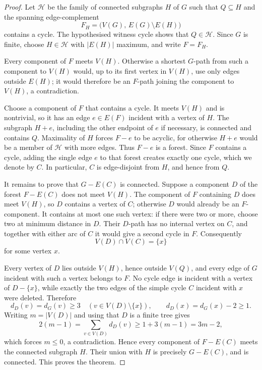 \documentclass[a4paper,11pt]{article}
\newcommand{\abs}[1]{\left\lvert#1\right\rvert}
\numberwithin{equation}{section}
\begin{document}
\begin{proof}
  Let $\mathcal H$ be the family of connected subgraphs $H$ of $G$ such that
  $Q\subseteq H$ and the spanning edge-complement
  \[
    F_H=\bigl(V(G),\,E(G)\setminus E(H)\bigr)
  \]
  contains a cycle. The hypothesised witness cycle shows that
  $Q\in\mathcal H$. Since $G$ is finite, choose $H\in\mathcal H$ with
  $\abs{E(H)}$ maximum, and write $F=F_H$.

  Every component of $F$ meets $V(H)$. Otherwise a shortest $G$-path from such
  a component to $V(H)$ would, up to its first vertex in $V(H)$, use only edges
  outside $E(H)$; it would therefore be an $F$-path joining the component to
  $V(H)$, a contradiction.

  Choose a component of $F$ that contains a cycle. It meets $V(H)$ and is
  nontrivial, so it has an edge $e\in E(F)$ incident with a vertex of $H$. The
  subgraph $H+e$, including the other endpoint of $e$ if necessary, is
  connected and contains $Q$. Maximality of $H$ forces $F-e$ to be acyclic,
  for otherwise $H+e$ would be a member of $\mathcal H$ with more edges. Thus
  $F-e$ is a forest. Since $F$ contains a cycle, adding the single edge $e$ to
  that forest creates exactly one cycle, which we denote by $C$. In
  particular, $C$ is edge-disjoint from $H$, and hence from $Q$.

  It remains to prove that $G-E(C)$ is connected. Suppose a component $D$ of
  the forest $F-E(C)$ does not meet $V(H)$. The component of $F$ containing $D$
  does meet $V(H)$, so $D$ contains a vertex of $C$; otherwise $D$ would
  already be an $F$-component. It contains at most one such vertex: if there
  were two or more, choose two at minimum distance in $D$. Their $D$-path has
  no internal vertex on $C$, and together with either arc of $C$ it would give
  a second cycle in $F$. Consequently
  \[
    V(D)\cap V(C)=\{x\}
  \]
  for some vertex $x$.

  Every vertex of $D$ lies outside $V(H)$, hence outside $V(Q)$, and every edge
  of $G$ incident with such a vertex belongs to $F$. No cycle edge is incident
  with a vertex of $D-\{x\}$, while exactly the two edges of the simple cycle
  $C$ incident with $x$ were deleted. Therefore
  \[
    d_D(v)=d_G(v)\ge 3\quad(v\in V(D)\setminus\{x\}),
    \qquad
    d_D(x)=d_G(x)-2\ge 1.
  \]
  Writing $m=\abs{V(D)}$ and using that $D$ is a finite tree gives
  \[
    2(m-1)=\sum_{v\in V(D)}d_D(v)\ge 1+3(m-1)=3m-2,
  \]
  which forces $m\le 0$, a contradiction. Hence every component of $F-E(C)$
  meets the connected subgraph $H$. Their union with $H$ is precisely
  $G-E(C)$, and is connected. This proves the theorem.
\end{proof}
\end{document}
